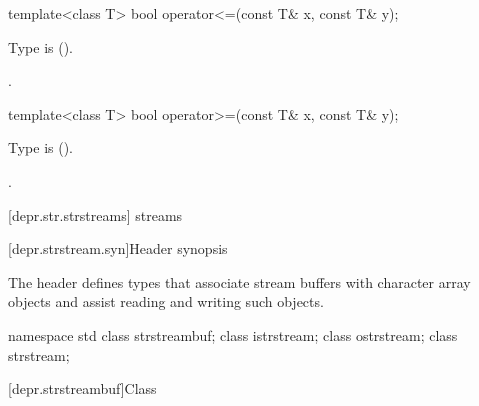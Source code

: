 %
\begin{itemdecl}
template<class T> bool operator<=(const T& x, const T& y);
\end{itemdecl}

\begin{itemdescr}
\pnum
\requires
Type  is  ().

\pnum
\returns
{}.
\end{itemdescr}

%
\begin{itemdecl}
template<class T> bool operator>=(const T& x, const T& y);
\end{itemdecl}

\begin{itemdescr}
\pnum
\requires
Type  is  ().

\pnum
\returns
{}.
\end{itemdescr}

[depr.str.strstreams]{ streams}

[depr.strstream.syn]{Header  synopsis}

\pnum
The header 
defines types that associate stream buffers with
character array objects and assist reading and writing such objects.

\begin{codeblock}
namespace std {
  class strstreambuf;
  class istrstream;
  class ostrstream;
  class strstream;
}
\end{codeblock}

[depr.strstreambuf]{Class }

